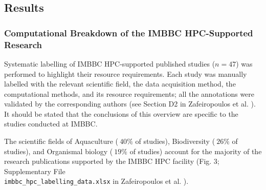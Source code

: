    \subsection{Results}

   \subsubsection*{Computational Breakdown of the IMBBC HPC-Supported Research}

   Systematic labelling of IMBBC HPC-supported published studies ($n = 47$) was performed to highlight their resource requirements. 
   Each study was manually labelled with the relevant scientific field, the data acquisition method, the computational methods, and its resource requirements; 
   all the annotations were validated by the corresponding authors (see Section D2 in Zafeiropoulos et al. \citep{haris_zafeiropoulos_2021_4665308}). 
   It should be stated that the conclusions of this overview are specific to the studies conducted at IMBBC.

   The scientific fields of Aquaculture ($~40\%$ of studies), Biodiversity ($~26\%$ of studies), and Organismal biology ($~19\%$ of studies) account for the majority of the research publications supported by the IMBBC HPC facility (Fig. 3; Supplementary File \\
   \texttt{imbbc\_hpc\_labelling\_data.xlsx} in Zafeiropoulos et al. \citep{haris_zafeiropoulos_2021_4665308}).
   

